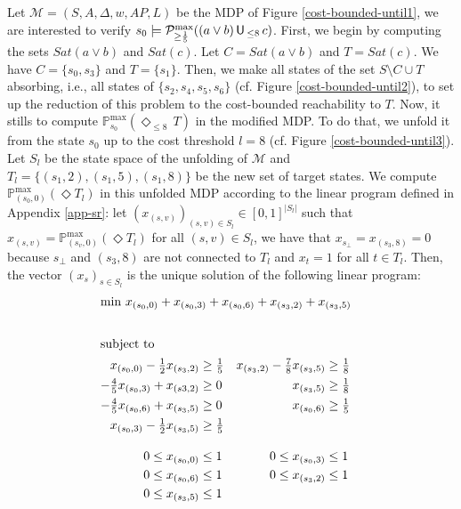 \begin{example} \label{cost-bounded-example}
Let $\mathcal{M} = (S, A, \Delta, w, AP, L)$ be the MDP of Figure \ref{cost-bounded-until1}, we are interested to verify $s_0 \models \mathcal{P}^{\max}_{\geq \frac{1}{5}}((a \vee b) \,\text{\sffamily U}\,_{\leq 8} \, c)$.
First, we begin by computing the sets $Sat(a \vee b)$ and $Sat(c)$. Let $C = Sat(a \vee b)$ and $T = Sat(c)$. We have $C = \{s_0, s_3\}$ and $T = \{ s_1 \}$.
Then, we make all states of the set $S \setminus C \cup T$ absorbing, i.e., all states of $\{s_2, s_4, s_5, s_6\}$ (cf. Figure \ref{cost-bounded-until2}), to set up the reduction of this problem to the cost-bounded reachability to $T$.
Now, it stills to compute $\mathbb{P}_{s_0}^{\max}(\Diamond_{\leq 8} \, T)$ in the modified MDP.
To do that, we unfold it from the state $s_0$ up to the cost threshold $l=8$ (cf. Figure \ref{cost-bounded-until3}). Let $S_l$ be the state space of the unfolding of $\mathcal{M}$ and $T_l = \{(s_1, 2), (s_1, 5), (s_1, 8)\} $
be the new set of target states.
We compute $\mathbb{P}^{\max}_{(s_0, 0)}(\Diamond T_l)$ in this unfolded MDP according to the linear program defined in Appendix \ref{app-sr}: let $(x_{(s, v)})_{(s, v) \in S_{l}} \in [0, 1]^{|S_l|}$ such that $x_{(s, v)} = \mathbb{P}^{\max}_{(s_v, 0)}(\Diamond T_l)$ for all $(s, v) \in S_l$, we have that $x_{s_\bot} = x_{(s_3, 8)} = 0$
because $s_{\bot}$ and $(s_3, 8)$ are not connected to $T_l$ and $x_t = 1$ for all $t \in T_l$. Then, the vector $(x_s)_{s \in S_l}$ is the unique solution of the following linear program:
\begin{align*}
\intertext{\centering $\min \, x_{(s_0,0)} + x_{(s_0,3)} + x_{(s_0,6)} + x_{(s_3,2)} + x_{(s_3,5)}$}\\
\intertext{subject to}
  x_{(s_0,0)} - \tfrac{1}{2} x_{(s_3,2)} &\geq \tfrac{1}{5} &
  x_{(s_3,2)} - \tfrac{7}{8} x_{(s_3,5)} &\geq \tfrac{1}{8}\\
  - \tfrac{4}{5} x_{(s_0,3)} + x_{(s3,2)} &\geq 0 &
  x_{(s_3,5)} &\geq \tfrac{1}{8}\\
  - \tfrac{4}{5} x_{(s_0,6)} + x_{(s_3,5)} &\geq 0 &
  x_{(s_0,6)} &\geq \tfrac{1}{5}\\
  x_{(s_0,3)} - \tfrac{1}{2} x_{(s_3,5)} &\geq \tfrac{1}{5} && & \\[1em]
  0 \leq x_{(s_0,0)} &\leq 1 &
  0 \leq x_{(s_0,3)} &\leq 1 \\
  0 \leq x_{(s_0,6)} &\leq 1 &
  0 \leq x_{(s_3,2)} &\leq 1 \\
  0 \leq x_{(s_3,5)} &\leq 1 & &

\end{align*}
\end{example}
